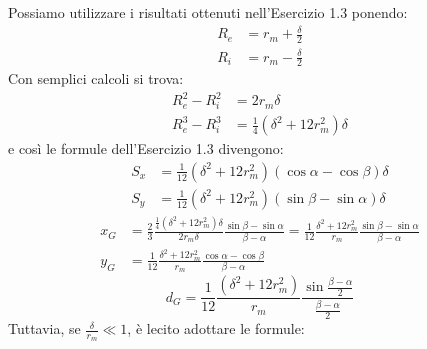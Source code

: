 \noindent Possiamo utilizzare i risultati ottenuti nell'Esercizio 1.3 ponendo:
\begin{align*}
R_e &= r_m+\frac{\delta}{2} \\
R_i &= r_m-\frac{\delta}{2}
\end{align*}
Con semplici calcoli si trova:
\begin{align*}
R_e^2-R_i^2 &= 2r_m\delta \\
R_e^3-R_i^3 &= \frac{1}{4}(\delta^2+12r_m^2)\delta
\end{align*}
e così le formule dell'Esercizio 1.3 divengono:
\begin{align*}
S_x &= \frac{1}{12}(\delta^2+12r_m^2)(\cos\alpha-\cos\beta)\delta \\
S_y &= \frac{1}{12}(\delta^2+12r_m^2)(\sin\beta-\sin\alpha)\delta
\end{align*}
\begin{align*}
x_G &= \frac{2}{3}\frac{\frac{1}{4}(\delta^2+12r_m^2)\delta}{2r_m\delta}\frac{\sin\beta-\sin\alpha}{\beta-\alpha} = \frac{1}{12}\frac{\delta^2+12r_m^2}{r_m}\frac{\sin\beta-\sin\alpha}{\beta-\alpha} \\
y_G &= \frac{1}{12}\frac{\delta^2+12r_m^2}{r_m}\frac{\cos\alpha-\cos\beta}{\beta-\alpha}
\end{align*}
\begin{equation*}
d_G = \frac{1}{12}\frac{(\delta^2+12r_m^2)}{r_m}\frac{\sin\frac{\beta-\alpha}{2}}{\frac{\beta-\alpha}{2}}
\end{equation*}
Tuttavia, se $\frac{\delta}{r_m}\ll1$, è lecito adottare le formule:
